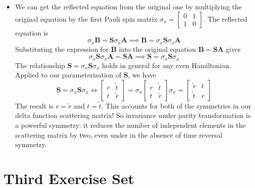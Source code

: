 \documentclass[11pt, a4paper]{article}
\renewcommand{\vec}[1]{\bm{#1}} %
\newcommand{\mat}[1]{\mathbf{#1}} %
\begin{document}
\begin{itemize}
	\item We can get the reflected equation from the original one by multiplying the original equation by the first Pauli spin matrix $ \sigma_{x} = 
	\begin{bmatrix}
		0 & 1\\
		1 & 0
	\end{bmatrix}$. The reflected equation is
	\begin{equation*}
		\sigma_{x}\vec{B} = \mat{S} \sigma_{x}\vec{A} \implies \vec{B} = \sigma_{x} \mat{S} \sigma_{x}\vec{A}
	\end{equation*}
	Substituting the expression for $ \vec{B} $ into the original equation $ \vec{B} = \mat{S} \vec{A} $ gives
	\begin{equation*}
		\sigma_{x} \mat{S} \sigma_{x}\vec{A} = \mat{S} \vec{A} \implies \mat{S} = \sigma_{x} \mat{S} \sigma_{x}
	\end{equation*}
	The relationship $ \mat{S} = \sigma_{x} \mat{S} \sigma_{x} $ holds in general for any even Hamiltonian. Applied to our parameterization of $ \mat{S} $, we have
	\begin{equation*}
		\mat{S} = \sigma_{x} \mat{S} \sigma_{x} \iff
		\begin{bmatrix}
			r & \tilde{t}\\
			t & \tilde{r}
		\end{bmatrix}
		= \sigma_{x}
		\begin{bmatrix}
			r & \tilde{t}\\
			t & \tilde{r}
		\end{bmatrix}
		\sigma_{x}
		=
		\begin{bmatrix}
			\tilde{r} & t\\
			\tilde{t} & r
		\end{bmatrix}
	\end{equation*}
	The result is $ r = \tilde{r} $ and $ t = \tilde{t} $. This accounts for both of the symmetries in our delta function scattering matrix! So invariance under parity transformation is a powerful symmetry: it reduces the number of independent elements in the scattering matrix by two, even under in the absence of time reversal symmetry.
	
	
\end{itemize}

\section{Third Exercise Set} 
\end{document}
